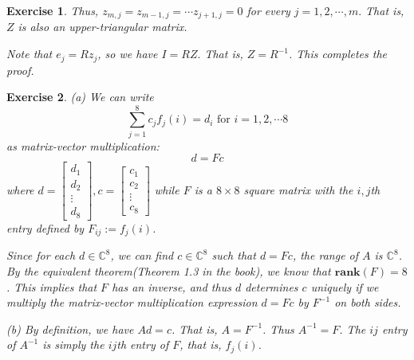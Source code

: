 \documentclass[paper=a4, fontsize=11pt]{scrartcl} %
\numberwithin{equation}{section} %
\numberwithin{figure}{section} %
\numberwithin{table}{section} %
\newtheorem{exercise}{Exercise}
\numberwithin{exercise}{section}
\begin{document}
\begin{exercise}
Thus, $z_{m,j}=z_{m-1,j}=\cdots z_{j+1,j}=0$ for every $j=1,2,\cdots, m.$ That is, $Z$ is also an upper-triangular matrix.

Note that $e_j=R z_j$, so we have $I=RZ.$ That is, $Z=R^{-1}$. This completes the proof.
\end{exercise}

\begin{exercise}
(a) We can write 
$$\sum_{j=1}^8 c_j f_j(i) =d_i \mbox { for } i=1,2,\cdots 8$$
as matrix-vector multiplication:
$$d=Fc$$
where $d=\begin{bmatrix}
d_1\\d_2\\
\vdots \\
d_8
\end{bmatrix},
 c=\begin{bmatrix}
 c_1\\c_2\\
 \vdots \\
c_8
\end{bmatrix}$ while $F$ is a $8\times 8$ square matrix with the $i,j$th entry defined by $F_{ij}:=f_j(i)$.

Since for each $d\in\mathbb{C}^8$, we can find $c\in \mathbb{C}^8$ such that $d=Fc$, the range of $A$ is $\mathbb{C}^8$. By the equivalent theorem(Theorem 1.3 in the book), we know that $\mathbf{rank}\left(F\right)=8$. This implies that $F$ has an inverse, and thus $d$ determines $c$ uniquely if we multiply the matrix-vector multiplication expression $d=Fc$ by $F^{-1}$ on both sides.

(b) By definition, we have $Ad=c$. That is, $A=F^{-1}$. Thus $A^{-1}=F$.  The $ij$ entry of $A^{-1}$ is simply the $ij$th entry of $F$, that is, $f_j(i)$.

\end{exercise}
\end{document}
